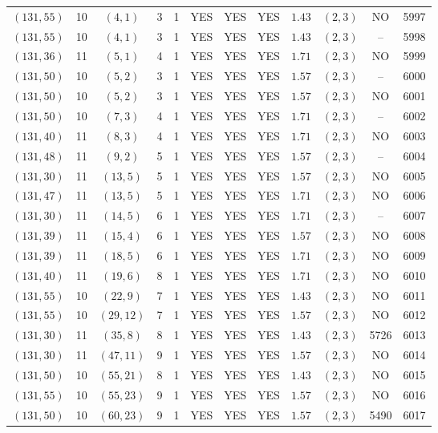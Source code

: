 \begin{longtable}{|c|c|c|c|c|c|c|c|c|c|c|c|}
$(131,55)$ & 10 & $(4,1)$ & 3 & 1 & YES & YES & YES & $1.43$ & $(2,3)$ & NO & 5997\\
$(131,55)$ & 10 & $(4,1)$ & 3 & 1 & YES & YES & YES & $1.43$ & $(2,3)$ & -- & 5998\\
$(131,36)$ & 11 & $(5,1)$ & 4 & 1 & YES & YES & YES & $1.71$ & $(2,3)$ & NO & 5999\\
$(131,50)$ & 10 & $(5,2)$ & 3 & 1 & YES & YES & YES & $1.57$ & $(2,3)$ & -- & 6000\\
$(131,50)$ & 10 & $(5,2)$ & 3 & 1 & YES & YES & YES & $1.57$ & $(2,3)$ & NO & 6001\\
$(131,50)$ & 10 & $(7,3)$ & 4 & 1 & YES & YES & YES & $1.71$ & $(2,3)$ & -- & 6002\\
$(131,40)$ & 11 & $(8,3)$ & 4 & 1 & YES & YES & YES & $1.71$ & $(2,3)$ & NO & 6003\\
$(131,48)$ & 11 & $(9,2)$ & 5 & 1 & YES & YES & YES & $1.57$ & $(2,3)$ & -- & 6004\\
$(131,30)$ & 11 & $(13,5)$ & 5 & 1 & YES & YES & YES & $1.57$ & $(2,3)$ & NO & 6005\\
$(131,47)$ & 11 & $(13,5)$ & 5 & 1 & YES & YES & YES & $1.71$ & $(2,3)$ & NO & 6006\\
$(131,30)$ & 11 & $(14,5)$ & 6 & 1 & YES & YES & YES & $1.71$ & $(2,3)$ & -- & 6007\\
$(131,39)$ & 11 & $(15,4)$ & 6 & 1 & YES & YES & YES & $1.57$ & $(2,3)$ & NO & 6008\\
$(131,39)$ & 11 & $(18,5)$ & 6 & 1 & YES & YES & YES & $1.71$ & $(2,3)$ & NO & 6009\\
$(131,40)$ & 11 & $(19,6)$ & 8 & 1 & YES & YES & YES & $1.71$ & $(2,3)$ & NO & 6010\\
$(131,55)$ & 10 & $(22,9)$ & 7 & 1 & YES & YES & YES & $1.43$ & $(2,3)$ & NO & 6011\\
$(131,55)$ & 10 & $(29,12)$ & 7 & 1 & YES & YES & YES & $1.57$ & $(2,3)$ & NO & 6012\\
$(131,30)$ & 11 & $(35,8)$ & 8 & 1 & YES & YES & YES & $1.43$ & $(2,3)$ & 5726 & 6013\\
$(131,30)$ & 11 & $(47,11)$ & 9 & 1 & YES & YES & YES & $1.57$ & $(2,3)$ & NO & 6014\\
$(131,50)$ & 10 & $(55,21)$ & 8 & 1 & YES & YES & YES & $1.43$ & $(2,3)$ & NO & 6015\\
$(131,55)$ & 10 & $(55,23)$ & 9 & 1 & YES & YES & YES & $1.57$ & $(2,3)$ & NO & 6016\\
$(131,50)$ & 10 & $(60,23)$ & 9 & 1 & YES & YES & YES & $1.57$ & $(2,3)$ & 5490 & 6017\\

\end{longtable}
